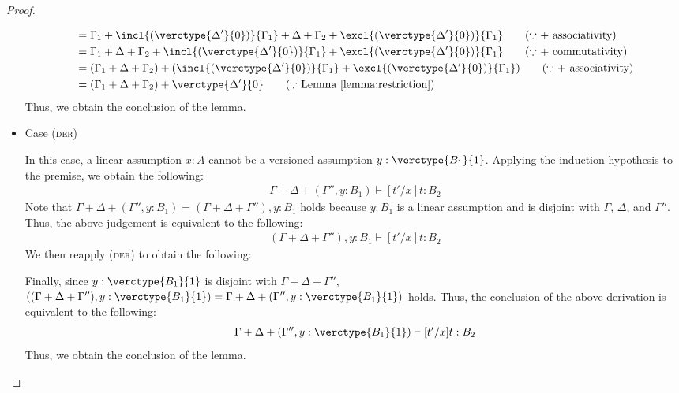 \begin{proof}
\begin{itemize}
\begin{align*}
    &= \Gamma_1 + \incl{(\verctype{\Delta'}{0})}{\Gamma_1} + \Delta + \Gamma_2 + \excl{(\verctype{\Delta'}{0})}{\Gamma_1} \tag{$\because$ $+$ associativity}\\
    &= \Gamma_1 + \Delta + \Gamma_2 + \incl{(\verctype{\Delta'}{0})}{\Gamma_1} + \excl{(\verctype{\Delta'}{0})}{\Gamma_1} \tag{$\because$ $+$ commutativity}\\
    &= (\Gamma_1 + \Delta + \Gamma_2) + (\incl{(\verctype{\Delta'}{0})}{\Gamma_1} + \excl{(\verctype{\Delta'}{0})}{\Gamma_1}) \tag{$\because$ $+$ associativity}\\
    &= (\Gamma_1 + \Delta + \Gamma_2) + \verctype{\Delta'}{0}\tag{$\because$ Lemma \ref{lemma:restriction}}
\end{align*}
Thus, we obtain the conclusion of the lemma.
\\

\item Case (\textsc{der})
\begin{center}
    \begin{minipage}{.55\linewidth}
    \end{minipage}
\end{center}
In this case, a linear assumption $x:A$ cannot be a versioned assumption $y:\verctype{B_1}{1}$.
Applying the induction hypothesis to the premise, we obtain the following:
\begin{align*}
    \Gamma + \Delta + (\Gamma'', y:B_1) \vdash [t'/x]t : B_2
\end{align*}
Note that $\Gamma + \Delta + (\Gamma'', y:B_1)= (\Gamma + \Delta + \Gamma''), y:B_1$ holds because $y:B_1$ is a linear assumption and is disjoint with $\Gamma$, $\Delta$, and $\Gamma''$.
Thus, the above judgement is equivalent to the following:
\begin{align*}
    (\Gamma + \Delta + \Gamma''), y:B_1 \vdash [t'/x]t : B_2
\end{align*}
We then reapply (\textsc{der}) to obtain the following:
\begin{center}
    \begin{minipage}{.65\linewidth}
    \end{minipage}
\end{center}
Finally, since $y:\verctype{B_1}{1}$ is disjoint with $\Gamma+\Delta+\Gamma''$, $((\Gamma + \Delta + \Gamma''), y:\verctype{B_1}{1}) = \Gamma + \Delta + (\Gamma'', y:\verctype{B_1}{1})$ holds. Thus, the conclusion of the above derivation is equivalent to the following:
\begin{align*}
    \Gamma + \Delta + (\Gamma'', y:\verctype{B_1}{1}) \vdash [t'/x]t : B_2
\end{align*}
Thus, we obtain the conclusion of the lemma.
\\


\end{itemize}
\end{proof}
